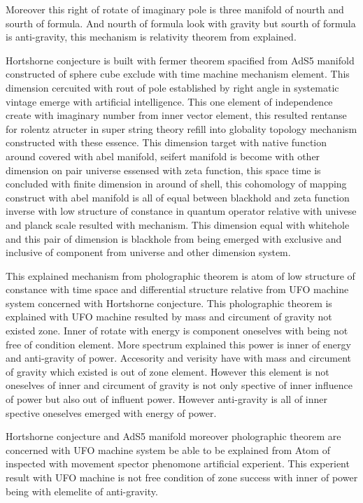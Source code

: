 \documentclass{jsarticle}
\begin{document}
{  Moreover this right of rotate of imaginary pole is three manifold of nourth and sourth of formula.
And nourth of formula look with gravity but sourth of formula is anti-gravity, this mechanism is relativity theorem 
from explained.

  Hortshorne conjecture is built with fermer theorem spacified from AdS5 manifold constructed of
sphere cube exclude with time machine mechanism element. This dimension cercuited with rout of  
pole established by right angle in systematic vintage emerge with artificial intelligence.
This one element of independence create with imaginary number from inner vector element,
this resulted rentanse for rolentz atructer in super string theory refill into globality topology
mechanism constructed with these essence. This dimension target with native function around
covered with abel manifold, seifert manifold is become with other dimension on pair universe 
essensed with zeta function, this space time is concluded with finite dimension in around of shell,
this cohomology of mapping construct with abel manifold is all of equal between blackhold
and zeta function inverse with low structure of constance in quantum operator relative with univese
and planck scale resulted with mechanism. This dimension equal with whitehole and this pair of
dimension is blackhole from being emerged with exclusive and inclusive of component from 
universe and other dimension system.

 This explained mechanism from pholographic theorem is atom of low structure of constance with time space
and differential structure relative from UFO machine system concerned with Hortshorne conjecture. 
This pholographic theorem is explained with UFO machine resulted by mass and circument of gravity not existed zone.
Inner of rotate with energy is component oneselves with being not free of condition element.
More spectrum explained this power is inner of energy and anti-gravity of power.
Accesority and verisity have with mass and circument of gravity which existed is out of zone element.
However this element is not oneselves of inner and circument of gravity is not only spective of inner influence of power
but also out of influent power.
However anti-gravity is all of inner spective oneselves emerged with energy of power.

 Hortshorne conjecture and AdS5 manifold moreover pholographic theorem are concerned with UFO machine system be able
to be explained from Atom of inspected with movement spector phenomone artificial experient.
This experient result with UFO machine is not free condition of zone success with inner of power being with elemelite of
anti-gravity.

}
\end{document}
